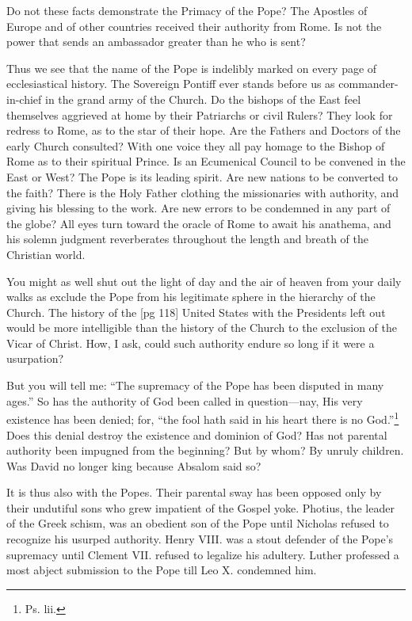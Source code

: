 Do not these facts demonstrate the Primacy of
the Pope? The Apostles of Europe and of other
countries received their authority from Rome. Is
not the power that sends an ambassador greater
than he who is sent?

Thus we see that the name of the Pope is indelibly
marked on every page of ecclesiastical history.
The Sovereign Pontiff ever stands before
us as commander-in-chief in the grand army of
the Church. Do the bishops of the East feel themselves
aggrieved at home by their Patriarchs or
civil Rulers? They look for redress to Rome, as
to the star of their hope. Are the Fathers and
Doctors of the early Church consulted? With
one voice they all pay homage to the Bishop of
Rome as to their spiritual Prince. Is an Ecumenical
Council to be convened in the East or West?
The Pope is its leading spirit. Are new nations
to be converted to the faith? There is the Holy
Father clothing the missionaries with authority,
and giving his blessing to the work. Are new errors
to be condemned in any part of the globe?
All eyes turn toward the oracle of Rome to await
his anathema, and his solemn judgment reverberates
throughout the length and breath of the Christian
world.

You might as well shut out the light of day
and the air of heaven from your daily walks as
exclude the Pope from his legitimate sphere in the
hierarchy of the Church. The history of the
[pg 118]
United States with the Presidents left out would
be more intelligible than the history of the Church
to the exclusion of the Vicar of Christ. How, I
ask, could such authority endure so long if it were
a usurpation?

But you will tell me: “The supremacy of the
Pope has been disputed in many ages.” So has
the authority of God been called in question—nay,
His very existence has been denied; for, “the fool
hath said in his heart there is no God.”\footnote{Ps. lii.} Does
this denial destroy the existence and dominion of
God? Has not parental authority been impugned
from the beginning? But by whom? By unruly
children. Was David no longer king because Absalom
said so?

It is thus also with the Popes. Their parental
sway has been opposed only by their undutiful
sons who grew impatient of the Gospel yoke.
Photius, the leader of the Greek schism, was an
obedient son of the Pope until Nicholas refused
to recognize his usurped authority. Henry VIII.
was a stout defender of the Pope's supremacy until
Clement VII. refused to legalize his adultery.
Luther professed a most abject submission to the
Pope till Leo X. condemned him.

